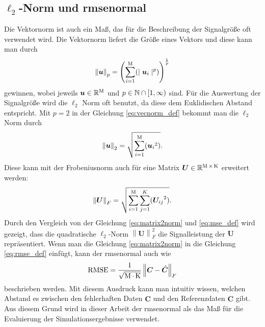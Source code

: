 \subsection*{$\ell_2$-Norm und \acrshort{rmsenormal}}
Die Vektornorm ist auch ein Maß, das für die Beschreibung der Signalgröße oft verwendet wird. Die Vektornorm liefert die Größe eines Vektors und diese kann man durch 
\begin{equation} \label{eq:vecnorm_def}
\left \| \bm{u} \right \|_p =  \left( \sum_{i=1}^{\operatorname{M}} ( \mid \bm{u}_i \mid ^p) \right)^{\frac{1}{p}}
\end{equation}
gewinnen, wobei jeweils $\bm{u} \in {\mathbb{R}}^{\operatorname{M}}$ und $p \in {\mathbb{N}} \cap [1, \infty)$ sind. Für die Auswertung der Signalgröße wird die $\ell_2$ Norm oft benutzt, da diese dem Euklidischen Abstand entspricht. Mit $p = 2$ in der Gleichung \ref{eq:vecnorm_def} bekommt man die $\ell_2$ Norm durch
\begin{equation}
\left \| \bm{u} \right \|_2 = \sqrt{ \sum_{i=1}^{\operatorname{M}} ( {\bm{u}_{i}} ^{2}) } .
\end{equation}
Diese kann mit der Frobeniusnorm auch für eine Matrix $\bm{U} \in {\mathbb{R}}^{\operatorname{M} \times \operatorname{K}}$ erweitert werden: 
\begin{equation} \label{eq:matrix2norm}
\left \| \bm{U} \right \|_{F} = \sqrt{ \sum_{i=1}^{\operatorname{M}} \sum_{j=1}^{K} ( {\bm{U}_{ij}} ^{2}) } .
\end{equation}
Durch den Vergleich von der Gleichung \ref{eq:matrix2norm} und \ref{eq:mse_def} wird gezeigt, dass die quadratische $\ell_2$-Norm $\left \| \bm{U} \right \|_{F}^{2}$ die Signalleistung der $\bm{U}$ repräsentiert. Wenn man die Gleichung \ref{eq:matrix2norm} in die Gleichung \ref{eq:rmse_def} einfügt, kann der \acrshort{rmsenormal} auch wie 
\begin{equation}
\operatorname{RMSE} = \frac{1}{\sqrt{\operatorname{M} \cdot \operatorname{K}}} \left \| \bm{C} - \hat{\bm{C}} \right \|_{F} 
\end{equation}
beschrieben werden. Mit diesem Ausdruck kann man intuitiv wissen, welchen Abstand es zwischen den fehlerhaften Daten $\hat{\bm{C}}$ und den Referenzdaten $\bm{C}$ gibt. Aus diesem Grund wird in dieser Arbeit der \acrshort{rmsenormal} als das Maß für die Evaluierung der Simulationsergebnisse verwendet. \par

